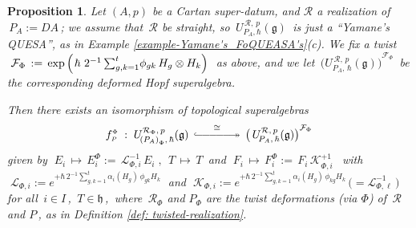 \documentclass[12pt,reqno,twoside,a4paper]{amsart}
\numberwithin{equation}{section}
\newtheorem{prop}[lema]{Proposition}
\theoremstyle{definition}
\newtheorem{free text}[lema]{}
\theoremstyle{remark}
\newcommand{\R}{{\mathcal R}}
\newcommand{\F}{{\mathcal F}}
\def \K {\mathcal{K}}
\def \L {\mathcal{L}}
\def \lieg{\mathfrak{g}}
\def \lieh{\mathfrak{h}}
\theoremstyle{plain}
\begin{document}
\begin{prop}  \label{prop: deform-Yamane=FoMpQUESA}
%
 Let  $ (A,p) $  be a Cartan super-datum,  and  $ \R $  a realization of  $ \, P_A := DA \, $;
%
%
we assume that  $ \, \R $  be straight, so
   $ \, U_{P_A,\hbar}^{\,\R,\,p}(\lieg) \, $  is just a ``Yamane's QUESA'', as in
 Example \ref{example-Yamane's_FoQUEASA's}\textit{(c)}.  We fix a twist
%
 $ \;  \F_\Phi \, := \, \exp\Big(\hskip1pt \hbar \,  \, 2^{-1} \,
 {\textstyle \sum_{g,k=1}^t} \phi_{gk} \, H_g \otimes H_k \Big) \; $
%
 as above, and we let  $ \, {\big( U_{P_A,\,\hbar}^{\,\R,\,p}(\lieg) \big)}^{\F_\Phi} \, $  be the corresponding deformed
 Hopf superalgebra.
                                                       \par
  Then there exists an isomorphism of topological superalgebras
%
  $$  f^{\scriptscriptstyle \Phi}_{\scriptscriptstyle P} \; :
   \; U_{\!{(P_A)}_\Phi,\,\hbar}^{\R_{\scriptscriptstyle \Phi},\,p}(\lieg)  \,\; {\buildrel \cong \over {\lhook\joinrel\relbar\joinrel\relbar\joinrel\relbar\joinrel\relbar\joinrel\relbar\joinrel\twoheadrightarrow}} \;\,
   {\big(\, U_{\!P_A,\,\hbar}^{\R,\,p}(\lieg)\big)}^{\F_\Phi}  $$
%
 given by
%
  $ \; E_i \, \mapsto \, E^{\scriptscriptstyle \Phi}_i := \, \L_{\Phi,i}^{-1} \, E_i \; , \,\; T \, \mapsto \, T \, $  and  $\; F_i \, \mapsto \, F^{\scriptscriptstyle \Phi}_i := \, F_i \, \K_{\Phi,i}^{+1} \; $
%
 \,with
%
 $ \; \L_{\Phi,i} := e^{+ \hbar \, 2^{-1} \sum_{g,k=1}^t \alpha_i(H_g) \, \phi_{gk} H_k} \; $
%
 and
%
 $ \; \K_{\Phi,i} := e^{+ \hbar \, 2^{-1} \sum_{g,k=1}^t \alpha_i(H_g) \, \phi_{kg} H_k} \, \big(= \L_{\Phi, \ell}^{-1} \,\big) \; $
%
 for all  $ \, i \in I \, $,  $ \, T \in \lieh \, $,  \,where  $ \, \R_\Phi $  and  $ P_\Phi $  are the twist deformations (via  $ \Phi $)  of  $ \, \R $  and  $ P \, $,  as in  Definition \ref{def: twisted-realization}.
%
\end{prop}
\end{document}
